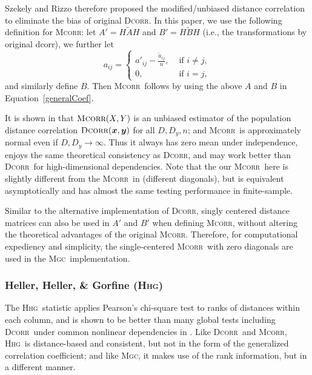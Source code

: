 \documentclass[11pt]{article}
\providecommand{\sct}[1]{{\normalfont\textsc{#1}}}
\providecommand{\mb}[1]{\boldsymbol{#1}}
\newcommand{\Mgc}{\sct{Mgc}}
\newcommand{\Hhg}{\sct{Hhg}}
\newcommand{\Dcorr}{\sct{Dcorr}}
\newcommand{\Mcorr}{\sct{Mcorr}}
\begin{document}
Szekely and  Rizzo \cite{SzekelyRizzo2013a, SzekelyRizzo2014, RizzoSzekely2016} therefore proposed the modified/unbiased distance correlation  to eliminate the bias of original \Dcorr. In this paper, we use the following definition for \Mcorr: let $A'=H\tilde{A}H$ and $B'=H\tilde{B}H$ (i.e., the transformations by original dcorr), we further let 
\[a_{ij} = \left\{
  \begin{array}{lr}
    a'_{ij}-\frac{\tilde{a}_{ij}}{n}, & \mbox{ if } i \neq j, \\
    0, &\mbox{ if } i = j,
  \end{array}
\right.
\]
and similarly define $B$. Then \Mcorr~follows by using the above $A$ and $B$ in Equation~\ref{generalCoef}.

It is shown in \cite{SzekelyRizzo2013a} that $\Mcorr(X,Y)$ is an unbiased estimator of the population distance correlation $\Dcorr(\mb{x},\mb{y})$ for all $D, D_y, n$; and \Mcorr~is approximately normal even if $D,D_y \rightarrow \infty$. Thus it always has zero mean under independence, enjoys the same theoretical consistency as \Dcorr, and may work better than \Dcorr~for high-dimensional dependencies. Note that the our \Mcorr~here is slightly different from the \Mcorr~in \cite{SzekelyRizzo2013a} (different diagonals), but is equivalent asymptotically and has almost the same testing performance in finite-sample.

Similar to the alternative implementation of \Dcorr, singly centered distance matrices can also be used in $A'$ and $B'$ when defining \Mcorr, without altering the theoretical advantages of the original \Mcorr. Therefore, for computational expediency and simplicity, the single-centered \Mcorr~with zero diagonals are used in the \Mgc~implementation.

\subsubsection{Heller, Heller, \& Gorfine (\Hhg)}
\label{appen:hhg}

The \Hhg~statistic applies Pearson's chi-square test to ranks of distances within each column, and is shown to be better than many global tests including \Dcorr~under common nonlinear dependencies in \cite{GorfineHellerHeller2012, HellerGorfine2013}. Like \Dcorr~and \Mcorr, \Hhg~is distance-based and consistent, but not in the form of the generalized correlation coefficient; 
and like \Mgc, it makes use of the rank information, but in a different manner.
\end{document}
